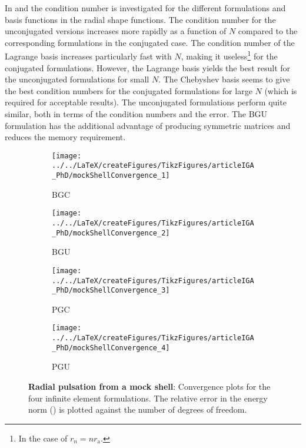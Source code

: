 In  and  the condition number is investigated for the different formulations and basis functions in the radial shape functions. The condition number for the unconjugated versions increases more rapidly as a function of $N$ compared to the corresponding formulations in the conjugated case. The condition number of the Lagrange basis increases particularly fast with $N$, making it useless\footnote{In the case of $r_n = nr_{\mathrm{a}}$.} for the conjugated formulations. However, the Lagrange basis yields the best result for the unconjugated formulations for small $N$. The Chebyshev basis seems to give the best condition numbers for the conjugated formulations for large $N$ (which is required for acceptable results). The unconjugated formulations perform quite similar, both in terms of the condition numbers and the error. The BGU formulation has the additional advantage of producing symmetric matrices and reduces the memory requirement. 
\begin{figure}
	\centering    
	\begin{subfigure}{0.49\textwidth}
		\centering
		\texttt{[image: ../../LaTeX/createFigures/TikzFigures/articleIGA\_PhD/mockShellConvergence\_1]}
	\caption{BGC}
	\end{subfigure}%
	\hspace*{0.02\textwidth}%
	\begin{subfigure}{0.49\textwidth}
		\centering
		\texttt{[image: ../../LaTeX/createFigures/TikzFigures/articleIGA\_PhD/mockShellConvergence\_2]}
		\caption{BGU}
	\end{subfigure}%
	\par\bigskip
	\par\bigskip
	\begin{subfigure}{0.49\textwidth}
		\centering
		\texttt{[image: ../../LaTeX/createFigures/TikzFigures/articleIGA\_PhD/mockShellConvergence\_3]}
		\caption{PGC}
	\end{subfigure}%
	\hspace*{0.02\textwidth}%
	\begin{subfigure}{0.49\textwidth}
		\centering
		\texttt{[image: ../../LaTeX/createFigures/TikzFigures/articleIGA\_PhD/mockShellConvergence\_4]}
		\caption{PGU}
	\end{subfigure}%
	\caption{\textbf{Radial pulsation from a mock shell}: Convergence plots for the four infinite element formulations. The relative error in the energy norm () is plotted against the number of degrees of freedom.}
	\label{Fig2:MS_convergence}
\end{figure}

